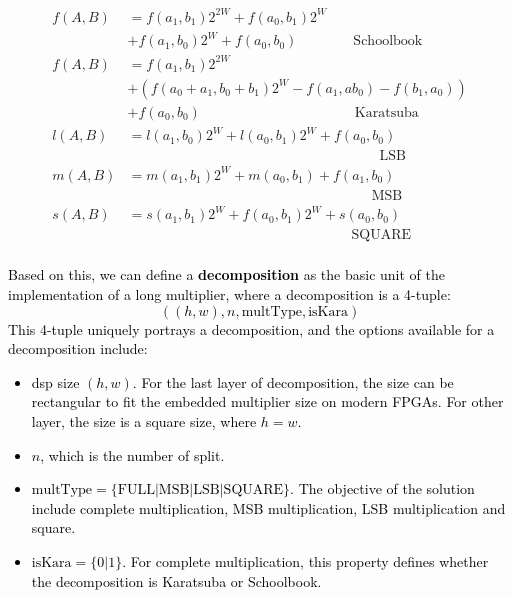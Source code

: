 \documentclass[conference]{IEEEtran}
\begin{document}
\begin{equation}
    \begin{split}
        f(A,B)&= f(a_1,b_1)2^{2W}+f(a_0,b_1)2^{W} \\
                & +f(a_1,b_0)2^{W}+f(a_0,b_0) \quad\quad\quad\quad { \text{Schoolbook}}\\
        f(A,B)&= f(a_1,b_1)2^{2W} \\
               & +(f(a_0+a_1,b_0+b_1)2^{W} - f(a_1,ab_0) - f(b_1, a_0)) \\
               & +f(a_0,b_0)  \quad\quad\quad\quad\quad\quad\quad\quad\quad\quad\quad  \text{Karatsuba}\\
       l(A,B) &= l(a_1,b_0)2^{W} + l(a_0,b_1)2^{W} + f(a_0,b_0)  \\
               & \quad\quad\quad\quad\quad\quad\quad\quad\quad\quad\quad\quad\quad\quad\quad\quad\quad\quad \text{LSB}\\
       m(A,B) &= m(a_1,b_1)2^{W} + m(a_0,b_1) + f(a_1,b_0)  \\
               & \quad\quad\quad\quad\quad\quad\quad\quad\quad\quad\quad\quad\quad\quad\quad\quad\quad\ \  \text{MSB}\\
       s(A,B) &= s(a_1,b_1)2^{W} + f(a_0,b_1)2^{W} + s(a_0,b_0) \\
               & \quad\quad\quad\quad\quad\quad\quad\quad\quad\quad\quad\quad\quad\quad\quad\quad \text{SQUARE}\\
    \end{split} 
\end{equation}

\textcolor{black}{
Based on this, we can define a \textbf{decomposition} as the basic unit of the implementation of a long multiplier, where a decomposition is a 4-tuple:
\begin{equation}
    ((h,w), n, \text{multType}, \text{isKara} )
\end{equation}
This 4-tuple uniquely portrays a decomposition, and the options available for a decomposition include:
\begin{itemize}
    \item dsp size $(h,w)$. For the last layer of decomposition, the size can be rectangular to fit the embedded multiplier size on modern FPGAs. For other layer, the size is a square size, where $h = w$.
    \item $n$, which is the number of split.
    \item $\text{multType} = \{\text{FULL} |\text{MSB}|\text{LSB}|\text{SQUARE}\}$. The objective of the solution include complete multiplication, MSB multiplication, LSB multiplication and square.
    \item $\text{isKara} = \{0|1\}$. For complete multiplication, this property defines whether the decomposition is Karatsuba or Schoolbook.
\end{itemize}
}
\end{document}
